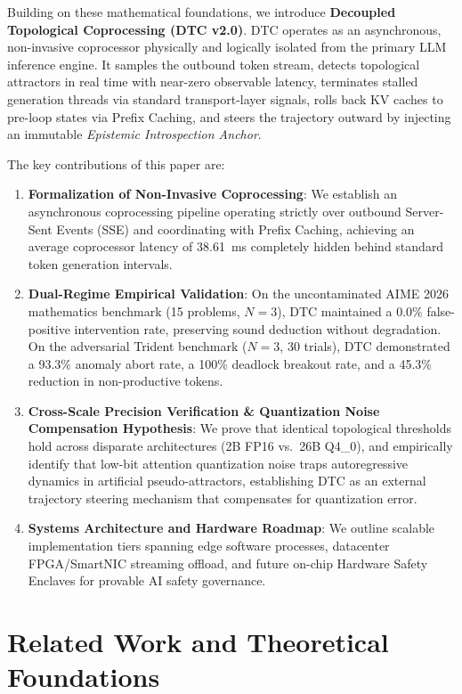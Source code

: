 \documentclass[11pt,a4paper]{article}
\begin{document}
Building on these mathematical foundations, we introduce \textbf{Decoupled Topological Coprocessing (DTC v2.0)}. DTC operates as an asynchronous, non-invasive coprocessor physically and logically isolated from the primary LLM inference engine. It samples the outbound token stream, detects topological attractors in real time with near-zero observable latency, terminates stalled generation threads via standard transport-layer signals, rolls back KV caches to pre-loop states via Prefix Caching, and steers the trajectory outward by injecting an immutable \textit{Epistemic Introspection Anchor}.

The key contributions of this paper are:
\begin{enumerate}
    \item \textbf{Formalization of Non-Invasive Coprocessing}: We establish an asynchronous coprocessing pipeline operating strictly over outbound Server-Sent Events (SSE) and coordinating with Prefix Caching, achieving an average coprocessor latency of 38.61~ms completely hidden behind standard token generation intervals.
    \item \textbf{Dual-Regime Empirical Validation}: On the uncontaminated AIME 2026 mathematics benchmark (15 problems, $N=3$), DTC maintained a 0.0\% false-positive intervention rate, preserving sound deduction without degradation. On the adversarial Trident benchmark ($N=3$, 30 trials), DTC demonstrated a 93.3\% anomaly abort rate, a 100\% deadlock breakout rate, and a 45.3\% reduction in non-productive tokens.
    \item \textbf{Cross-Scale Precision Verification \& Quantization Noise Compensation Hypothesis}: We prove that identical topological thresholds hold across disparate architectures (2B FP16 vs.\ 26B Q4\_0), and empirically identify that low-bit attention quantization noise traps autoregressive dynamics in artificial pseudo-attractors, establishing DTC as an external trajectory steering mechanism that compensates for quantization error.
    \item \textbf{Systems Architecture and Hardware Roadmap}: We outline scalable implementation tiers spanning edge software processes, datacenter FPGA/SmartNIC streaming offload, and future on-chip Hardware Safety Enclaves for provable AI safety governance.
\end{enumerate}

\section{Related Work and Theoretical Foundations}
\end{document}
